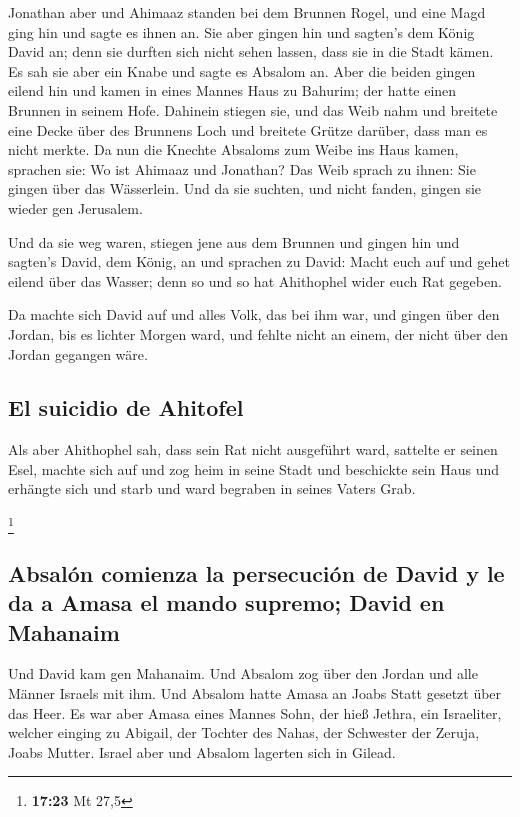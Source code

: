  Jonathan aber und Ahimaaz standen bei dem Brunnen Rogel,
und eine Magd ging hin und sagte es ihnen an. Sie aber gingen hin und
sagten's dem König David an; denn sie durften sich nicht sehen lassen,
dass sie in die Stadt kämen.  Es sah sie aber ein Knabe
und sagte es Absalom an. Aber die beiden gingen eilend hin und kamen in
eines Mannes Haus zu Bahurim; der hatte einen Brunnen in seinem Hofe.
Dahinein stiegen sie,  und das Weib nahm und breitete
eine Decke über des Brunnens Loch und breitete Grütze darüber, dass man
es nicht merkte.  Da nun die Knechte Absaloms zum Weibe
ins Haus kamen, sprachen sie: Wo ist Ahimaaz und Jonathan? Das Weib
sprach zu ihnen: Sie gingen über das Wässerlein. Und da sie suchten, und
nicht fanden, gingen sie wieder gen Jerusalem.

 Und da sie weg waren, stiegen jene aus dem Brunnen und
gingen hin und sagten's David, dem König, an und sprachen zu David:
Macht euch auf und gehet eilend über das Wasser; denn so und so hat
Ahithophel wider euch Rat gegeben.

 Da machte sich David auf und alles Volk, das bei ihm
war, und gingen über den Jordan, bis es lichter Morgen ward, und fehlte
nicht an einem, der nicht über den Jordan gegangen wäre.

\hypertarget{el-suicidio-de-ahitofel}{%
\subsection{El suicidio de Ahitofel}\label{el-suicidio-de-ahitofel}}

 Als aber Ahithophel sah, dass sein Rat nicht ausgeführt
ward, sattelte er seinen Esel, machte sich auf und zog heim in seine
Stadt und beschickte sein Haus und erhängte sich und starb und ward
begraben in seines Vaters Grab.

\footnote{\textbf{17:23} Mt 27,5}

\hypertarget{absaluxf3n-comienza-la-persecuciuxf3n-de-david-y-le-da-a-amasa-el-mando-supremo-david-en-mahanaim}{%
\subsection{Absalón comienza la persecución de David y le da a Amasa el
mando supremo; David en
Mahanaim}\label{absaluxf3n-comienza-la-persecuciuxf3n-de-david-y-le-da-a-amasa-el-mando-supremo-david-en-mahanaim}}

 Und David kam gen Mahanaim. Und Absalom zog über den
Jordan und alle Männer Israels mit ihm.  Und Absalom
hatte Amasa an Joabs Statt gesetzt über das Heer. Es war aber Amasa
eines Mannes Sohn, der hieß Jethra, ein Israeliter, welcher einging zu
Abigail, der Tochter des Nahas, der Schwester der Zeruja, Joabs Mutter.
 Israel aber und Absalom lagerten sich in Gilead.

